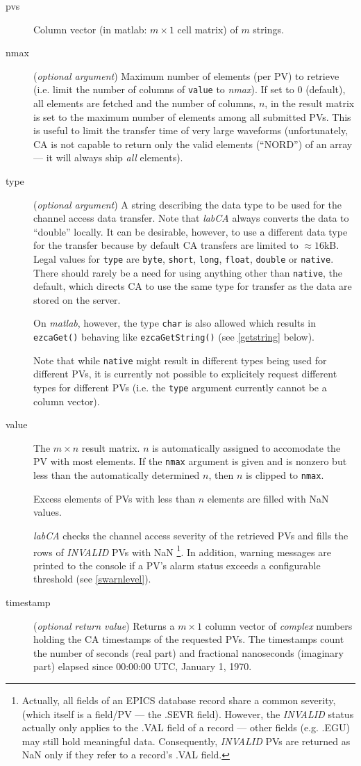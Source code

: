 \documentclass{article}
\newcommand{\sca}{{\em labCA}}
\newcommand{\matlab}{{\em matlab}}
\newcommand{\com}[1]{{\tt #1}}
\newcommand{\NAN}{\mbox{NaN}}
\newcommand{\PVITEM}{
\item[pvs] Column vector (in matlab: $m\times 1$ cell matrix)
of $m$ strings.
}
\begin{document}
\begin{description}
\PVITEM
%
%
\item[nmax] ({\em optional argument}) Maximum number of elements
(per PV) to retrieve (i.e. limit the number of columns of \com{value} to
{\em nmax}).
If set to 0 (default), all elements are fetched
and the number of columns, $n$, in the result matrix is set to the
maximum number of elements among all submitted PVs. This is useful
to limit the transfer time of very large waveforms (unfortunately,
CA is not capable to return only the valid elements (``NORD'') of
an array --- it will always ship {\em all} elements).
%
%
\item[type] ({\em optional argument}) A string describing the
data type to be used for the channel access data transfer. Note
that \sca{} always converts the data to ``double'' locally. It
can be desirable, however, to use a different data type for the
transfer because by default CA transfers are limited to $\approx 16$kB.
Legal values for \com{type}{} are \com{byte}, \com{short}, \com{long},
\com{float}, \com{double} or \com{native}. There should rarely
be a need for using anything other than \com{native}, the default,
which directs CA to use the same type for transfer as the data are
stored on the server.

On \matlab{}{}, however, the type \com{char}{} is also allowed which
results in \com{ezcaGet()}{} behaving like \com{ezcaGetString()}{}
(see \ref{getstring} below).

Note that while \com{native}{} might result in different types
being used for different PVs, it is currently not possible to
explicitely request different types for different PVs (i.e. the
\com{type}{} argument currently cannot be a column vector).
%
%
\item[value] The $m\times n$ result matrix. $n$ is automatically
assigned to accomodate the PV with most elements. If the \com{nmax}{}
argument is given and is nonzero but less than the automatically
determined $n$, then $n$ is clipped to \com{nmax}.

Excess elements of PVs with less than $n$ elements are filled with
\NAN{} values.

\sca{} checks the channel access severity of the retrieved PVs and
fills the rows of {\em INVALID} PVs with \NAN%
\footnote{
Actually, all fields of an EPICS database record share a common
severity, (which itself is a field/PV --- the .SEVR field). However,
the {\em INVALID} status actually only applies to the .VAL field
of a record --- other fields (e.g. .EGU) may still hold meaningful data.
Consequently, {\em INVALID} PVs are returned as \NAN{} only if
they refer to a record's .VAL field.
}. In addition, warning
messages are printed to the console if a PV's alarm status exceeds
a configurable threshold (see \ref{swarnlevel}).
%
%
\item[timestamp] ({\em optional return value}) Returns a $m\times 1$
column vector of {\em complex} numbers holding the CA timestamps of
the requested PVs. The timestamps count the number of seconds (real part)
and fractional nanoseconds (imaginary part) elapsed since
00:00:00 UTC, January 1, 1970.
\end{description}
\end{document}
